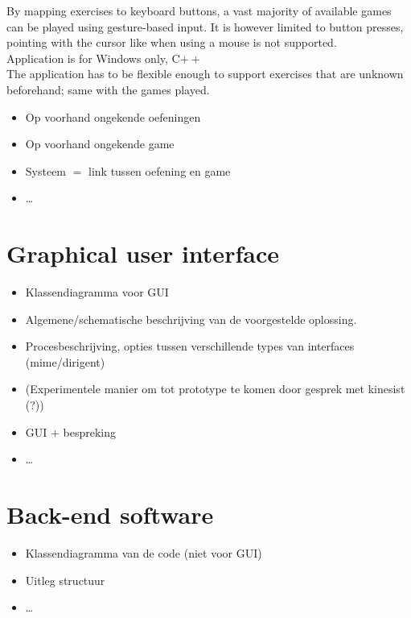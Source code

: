 By mapping exercises to keyboard buttons, a vast majority of available games can be played using gesture-based input. It is however limited to button presses, pointing with the cursor like when using a mouse is not supported.\\

Application is for Windows only, C$++$\\

The application has to be flexible enough to support exercises that are unknown beforehand; same with the games played.

\begin{itemize}
\item Op voorhand ongekende oefeningen
\item Op voorhand ongekende game
\item Systeem $=$ link tussen oefening en game
\item \ldots
\end{itemize}


\section{Graphical user interface}

\begin{itemize}
\item Klassendiagramma voor GUI
\item Algemene/schematische beschrijving van de voorgestelde oplossing.
\item Procesbeschrijving, opties tussen verschillende types van interfaces (mime/dirigent)
\item (Experimentele manier om tot prototype te komen door gesprek met kinesist (?))
\item GUI $+$ bespreking
\item \ldots
\end{itemize}


\section{Back-end software}
\label{section: Back-end software}

\begin{itemize}
\item Klassendiagramma van de code (niet voor GUI)
\item Uitleg structuur
\item \ldots
\end{itemize}


